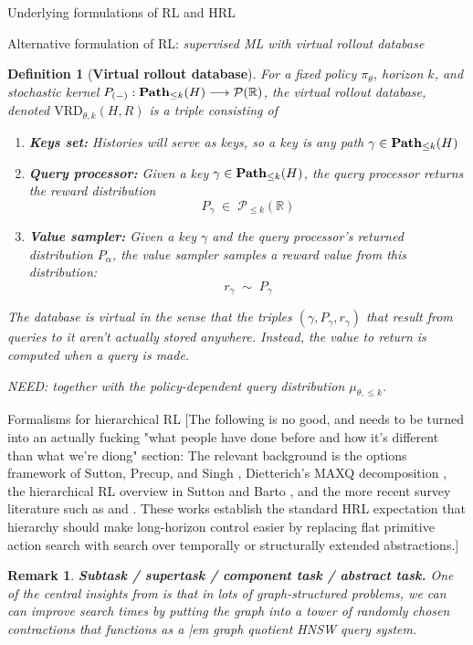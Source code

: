 \documentclass[11pt]{article}
\newtheorem{definition}[subsubsection]{Definition}
\newtheorem{remark}[subsubsection]{Remark}
\begin{document}
\begin{section}{Underlying formulations of RL and HRL}
\begin{subsection}{Alternative formulation of RL: {\em supervised ML with virtual rollout database}}
\begin{definition}[{\bf Virtual rollout database}]
\normalfont
For a fixed policy \(\pi_\theta\), horizon \(k\), and stochastic kernel $P_{(-)}:\bold{Path}_{\le k}(H)\longrightarrow\mathcal{P}(\mathbb{R})$, the {\em virtual rollout database}, denoted $\text{VRD}_{\theta,k}(H,R)$ is a triple  consisting of
\begin{enumerate}
\item {\bf Keys set:} Histories will serve as {\em keys}, so a key is any path $\gamma\in\bold{Path}_{\le k}(H)$
\item {\bf Query processor:} Given a key $\gamma\in\bold{Path}_{\le k}(H)$, the {\em query processor} returns the reward distribution
$$
P_{\gamma}\;\in\;\mathcal{P}_{\le k}(\mathbb{R})
$$
\item {\bf Value sampler:} Given a key $\gamma$ and the query processor's returned distribution $P_{\alpha}$, the {\em value sampler} samples a reward value from this distribution:
$$
r_{\gamma}\;\sim\;P_{\gamma}
$$
\end{enumerate}
The database is {\em virtual} in the sense that the triples $(\gamma,P_{\gamma},r_\gamma)$ that result from queries to it aren't actually stored anywhere. Instead, the value to return is computed when a query is made. 

NEED: together with the policy-dependent query distribution \(\mu_{\theta,\le k}\). 
\end{definition}

\end{subsection}

\begin{subsection}{Formalisms for hierarchical RL}
{\color{blue} [The following is no good, and needs to be turned into an actually fucking "what people have done before and how it's different than what we're diong" section: The relevant background is the options framework of Sutton, Precup, and Singh \cite{SPS}, Dietterich's MAXQ decomposition \cite{Diet}, the hierarchical RL overview in Sutton and Barto \cite{SBRL}, and the more recent survey literature such as \cite{PSTQ} and \cite{HutsebautBuysseHRLSurvey}. These works establish the standard HRL expectation that hierarchy should make long-horizon control easier by replacing flat primitive action search with search over temporally or structurally extended abstractions.]}

\begin{remark}
{\bf Subtask / supertask / component task / abstract task.}
\normalfont
One of the central insights from \cite{MalikThesis} is that in lots of graph-structured problems, we can can improve search times by putting the graph into a tower of randomly chosen contractions that functions as a {|em graph quotient HNSW} query system.


\end{remark}
\end{subsection}
\end{section}
\end{document}

